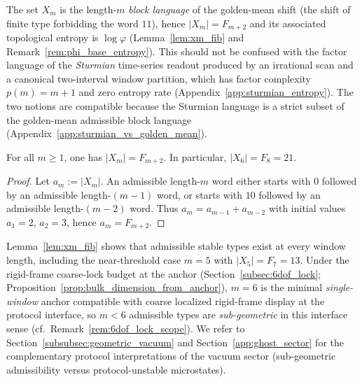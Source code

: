 \begin{remark}
\label{rem:sturmian_vs_golden_mean}
The set $X_m$ is the length-$m$ \emph{block language} of the golden-mean shift
(the shift of finite type forbidding the word $11$), hence $|X_m|=F_{m+2}$ and
its associated topological entropy is $\log\varphi$
(Lemma~\ref{lem:xm_fib} and Remark~\ref{rem:phi_base_entropy}).
This should not be confused with the factor language of the \emph{Sturmian}
time-series readout produced by an irrational scan and a canonical two-interval
window partition, which has factor complexity $p(m)=m+1$ and zero entropy rate
(Appendix~\ref{app:sturmian_entropy}).
The two notions are compatible because the Sturmian language is a strict subset
of the golden-mean admissible block language (Appendix~\ref{app:sturmian_vs_golden_mean}).
\end{remark}

\begin{lemma}\label{lem:xm_fib}
For all $m\ge 1$, one has $|X_m|=F_{m+2}$. In particular, $|X_6|=F_8=21$.
\end{lemma}
\begin{proof}
Let $a_m:=|X_m|$.
An admissible length-$m$ word either starts with $0$ followed by an admissible length-$(m-1)$ word, or starts with $10$ followed by an admissible length-$(m-2)$ word.
Thus $a_m=a_{m-1}+a_{m-2}$ with initial values $a_1=2$, $a_2=3$, hence $a_m=F_{m+2}$.
\end{proof}

\begin{remark}\label{rem:subgeometric_xm}
Lemma~\ref{lem:xm_fib} shows that admissible stable types exist at every window length, including the near-threshold case $m=5$ with $|X_5|=F_7=13$.
Under the rigid-frame coarse-lock budget at the anchor (Section~\ref{subsec:6dof_lock}; Proposition~\ref{prop:bulk_dimension_from_anchor}), $m=6$ is the minimal \emph{single-window} anchor compatible with coarse localized rigid-frame display at the protocol interface, so $m<6$ admissible types are \emph{sub-geometric} in this interface sense (cf.\ Remark~\ref{rem:6dof_lock_scope}).
We refer to Section~\ref{subsubsec:geometric_vacuum} and Section~\ref{app:ghost_sector} for the complementary protocol interpretations of the vacuum sector (sub-geometric admissibility versus protocol-unstable microstates).
\end{remark}

